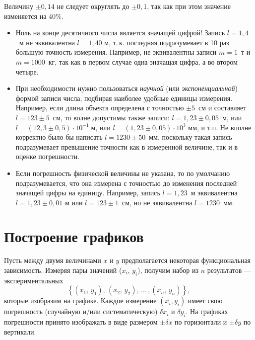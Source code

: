 Величину $\pm0{,}14$ не следует округлять до $\pm0{,}1$, так как
при этом значение изменяется на 40\%.
\begin{itemize}
\item Ноль на конце десятичного числа является значащей цифрой! Запись
$l=1{,}4$~м
не эквивалентна $l=1{,}40$ м, т.\,к. последняя подразумевает в 10
раз большую точность измерения. Например, не эквивалентны записи $m=1$~т
и $m=1000$~кг, так как в первом случае одна значащая цифра, а во
втором четыре.
\item При необходимости нужно пользоваться\emph{ научной} (или
\emph{экспоненциальной})
формой записи числа, подбирая наиболее удобные единицы измерения.
Например, если длина объекта определена с точностью $\pm5$~см и
составляет $l=123\pm5$~см, то волне допустимы также записи:
$l=1{,}23\pm0{,}05$~м,
или $l=\left(12{,}3\pm0{,}5\right)\cdot10^{-1}\;\text{м}$, или
$l=\left(1{,}23\pm0{,}05\right)\cdot10^{3}\text{ мм}$,
и т.п. Не вполне корректно было бы написать $l=1230\pm50$~мм, поскольку
такая запись подразумевает превышение точности как в измеренной величине,
так и в оценке погрешности.
\item Если погрешность физической величины не указана, то по умолчанию
подразумевается,
что она измерена с точностью до изменения последней значащей цифры
на единицу. Например, запись $l=1{,}23$~м эквивалентна $l=1{,}23\pm0{,}01$
м или $l=123\pm1$~см, но не эквивалентна $l=1230$~мм.
\end{itemize}




\section{Построение графиков}\label{sec:graph}

\normalsize
Пусть между двумя величинами $x$ и $y$ предполагается некоторая
функциональная зависимость. Измеряя пары значений ($x_{i},\,y_{i}$),
получим набор из $n$ результатов --- экспериментальных 
\[
\left\{ (x_{1},\,y_{1}),\,(x_{2},\,y_{2}),\,\ldots\,,(x_{n},\,y_{n})\right\},
\]
которые изобразим на графике. Каждое измерение $\left(x_{i},y_{i}\right)$
имеет свою погрешность (случайную и/или систематическую)
$\delta x_i$ и $\delta y_i$. На графиках погрешности принято изображать в виде  размером $\pm\delta x$ по горизонтали и 
$\pm\delta y$ по вертикали.

